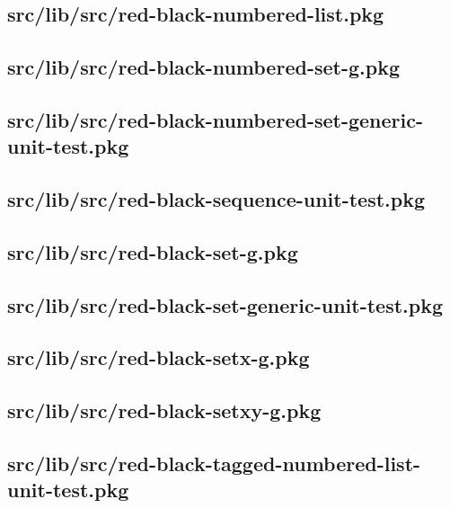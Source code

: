 \subsection{src/lib/src/red-black-numbered-list.pkg}


\subsection{src/lib/src/red-black-numbered-set-g.pkg}


\subsection{src/lib/src/red-black-numbered-set-generic-unit-test.pkg}


\subsection{src/lib/src/red-black-sequence-unit-test.pkg}


\subsection{src/lib/src/red-black-set-g.pkg}


\subsection{src/lib/src/red-black-set-generic-unit-test.pkg}


\subsection{src/lib/src/red-black-setx-g.pkg}


\subsection{src/lib/src/red-black-setxy-g.pkg}


\subsection{src/lib/src/red-black-tagged-numbered-list-unit-test.pkg}


